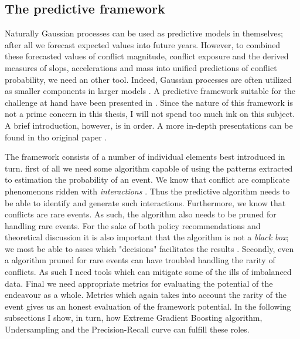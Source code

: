 \documentclass[a4paper]{article}
\begin{document}
\subsection{The predictive framework}


Naturally Gaussian processes can be used as predictive models in themselves; after all we forecast expected values into future years. However, to combined these forecasted values of conflict magnitude, conflict exposure and the derived measures of slops, accelerations and mass into unified predictions of conflict probability, we need an other tool. Indeed, Gaussian processes are often utilized as smaller components in larger models \citep[505]{Gelman_2013}. A predictive framework suitable for the challenge at hand have been presented in \cite{Maase}. Since the nature of this framework is not a prime concern in this thesis, I will not spend too much ink on this subject. A brief introduction, however, is in order. A more in-depth presentations can be found in tho original paper \citep[9-12]{Maase}.\par %
\par

The framework consists of a number of individual elements best introduced in turn. first of all we need some algorithm capable of using the patterns extracted to estimation the probability of an event. We know that conflict are complicate phenomenons ridden with \emph{interactions} \citep[474]{cederman2017predicting}. Thus the predictive algorithm needs to be able to identify and generate such interactions. Furthermore, we know that conflicts are rare events. As such, the algorithm also needs to be pruned for handling rare events. For the sake of both policy recommendations and theoretical discussion it is also important that the algorithm is not a \emph{black box}; we most be able to asses which "decisions" facilitates the results \cite[476]{cederman2017predicting}. Secondly, even a algorithm pruned for rare events can have troubled handling the rarity of conflicts. As such I need tools which can mitigate some of the ills of imbalanced data. Final we need appropriate metrics for evaluating the potential of the endeavour as a whole. Metrics which again takes into account the rarity of the event gives us an honest evaluation of the framework potential. In the following subsections I show, in turn, how Extreme Gradient Boosting algorithm, Undersampling and the Precision-Recall curve can fulfill these roles.\par
\end{document}
